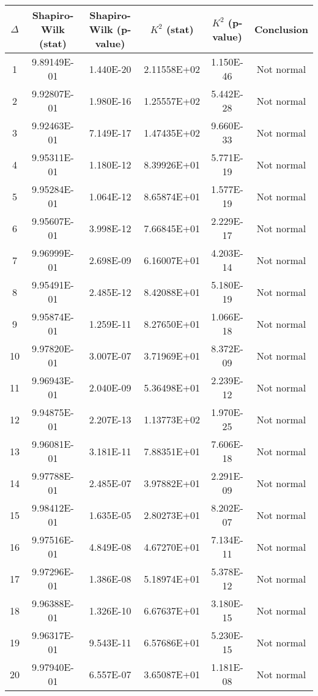 \begin{table}[h]
	\begin{tabular}{|c|c|c|c|c|c|}
		\hline
		$\Delta$ &  Shapiro-Wilk (stat) & Shapiro-Wilk (p-value) & $K^2$ (stat) & $K^2$ (p-value) & Conclusion\\\hline
		\hline
		1 & 9.89149E-01 & 1.440E-20 & 2.11558E+02 & 1.150E-46 & Not normal\\\hline
		2 & 9.92807E-01 & 1.980E-16 & 1.25557E+02 & 5.442E-28 & Not normal\\\hline
		3 & 9.92463E-01 & 7.149E-17 & 1.47435E+02 & 9.660E-33 & Not normal\\\hline
		4 & 9.95311E-01 & 1.180E-12 & 8.39926E+01 & 5.771E-19 & Not normal\\\hline
		5 & 9.95284E-01 & 1.064E-12 & 8.65874E+01 & 1.577E-19 & Not normal\\\hline
		6 & 9.95607E-01 & 3.998E-12 & 7.66845E+01 & 2.229E-17 & Not normal\\\hline
		7 & 9.96999E-01 & 2.698E-09 & 6.16007E+01 & 4.203E-14 & Not normal\\\hline
		8 & 9.95491E-01 & 2.485E-12 & 8.42088E+01 & 5.180E-19 & Not normal\\\hline
		9 & 9.95874E-01 & 1.259E-11 & 8.27650E+01 & 1.066E-18 & Not normal\\\hline
		10 & 9.97820E-01 & 3.007E-07 & 3.71969E+01 & 8.372E-09 & Not normal\\\hline
		11 & 9.96943E-01 & 2.040E-09 & 5.36498E+01 & 2.239E-12 & Not normal\\\hline
		12 & 9.94875E-01 & 2.207E-13 & 1.13773E+02 & 1.970E-25 & Not normal\\\hline
		13 & 9.96081E-01 & 3.181E-11 & 7.88351E+01 & 7.606E-18 & Not normal\\\hline
		14 & 9.97788E-01 & 2.485E-07 & 3.97882E+01 & 2.291E-09 & Not normal\\\hline
		15 & 9.98412E-01 & 1.635E-05 & 2.80273E+01 & 8.202E-07 & Not normal\\\hline
		16 & 9.97516E-01 & 4.849E-08 & 4.67270E+01 & 7.134E-11 & Not normal\\\hline
		17 & 9.97296E-01 & 1.386E-08 & 5.18974E+01 & 5.378E-12 & Not normal\\\hline
		18 & 9.96388E-01 & 1.326E-10 & 6.67637E+01 & 3.180E-15 & Not normal\\\hline
		19 & 9.96317E-01 & 9.543E-11 & 6.57686E+01 & 5.230E-15 & Not normal\\\hline
		20 & 9.97940E-01 & 6.557E-07 & 3.65087E+01 & 1.181E-08 & Not normal\\\hline

\end{tabular}
\end{table}
